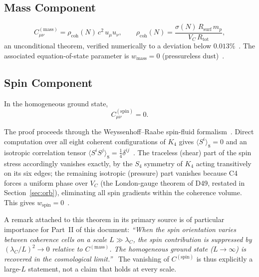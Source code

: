 \documentclass[11pt,a4paper]{article}
\newcommand{\Kfour}{K_4}
\newcommand{\VC}{V_C}
\newcommand{\Rsurf}{R_{\mathrm{surf}}}
\newcommand{\Rtot}{R_{\mathrm{tot}}}
\newcommand{\lamC}{\lambda_C}
\newcommand{\rhocoh}{\rho_{\mathrm{coh}}}
\newcommand{\Cmass}{C^{(\mathrm{mass})}}
\newcommand{\Cspin}{C^{(\mathrm{spin})}}
\begin{document}
\subsection{Mass Component}

\begin{theorembox}
\begin{equation}
\Cmass_{\mu\nu} = \rhocoh(N)\,c^2\,u_\mu u_\nu, \qquad \rhocoh(N) = \frac{\sigma(N)\,\Rsurf\,m_p}{\VC\,\Rtot},
\label{eq:Cmass}
\end{equation}
an unconditional theorem, verified numerically to a deviation below $0.013\%$~\citep{D48v3}. The associated equation-of-state parameter is $w_{\mathrm{mass}}=0$ (pressureless dust)~\citep{D54}.
\end{theorembox}

\subsection{Spin Component}
\label{sec:spin}

\begin{theorembox}
In the homogeneous ground state,
\begin{equation}
\Cspin_{\mu\nu} = 0.
\label{eq:Cspin}
\end{equation}
\end{theorembox}

The proof proceeds through the Weyssenhoff--Raabe spin-fluid formalism~\citep{Weyssenhoff1947}. Direct computation over all eight coherent configurations of $\Kfour$ gives $\langle S^i\rangle_8=0$ and an isotropic correlation tensor $\langle S^iS^j\rangle_8=\tfrac14\delta^{ij}$~\citep{D48v3}. The traceless (shear) part of the spin stress accordingly vanishes exactly, by the $S_4$ symmetry of $\Kfour$ acting transitively on its six edges; the remaining isotropic (pressure) part vanishes because C4 forces a uniform phase over $\VC$ (the London-gauge theorem of D49, restated in Section~\ref{sec:orb}), eliminating all spin gradients within the coherence volume. This gives $w_{\mathrm{spin}}=0$~\citep{D54}.

A remark attached to this theorem in its primary source is of particular importance for Part~II of this document: \emph{``When the spin orientation varies between coherence cells on a scale $L\gg\lamC$, the spin contribution is suppressed by $(\lamC/L)^2\to0$ relative to $\Cmass$. The homogeneous ground state ($L\to\infty$) is recovered in the cosmological limit.''}~\citep{D48v3} The vanishing of $\Cspin$ is thus explicitly a large-$L$ statement, not a claim that holds at every scale.
\end{document}
